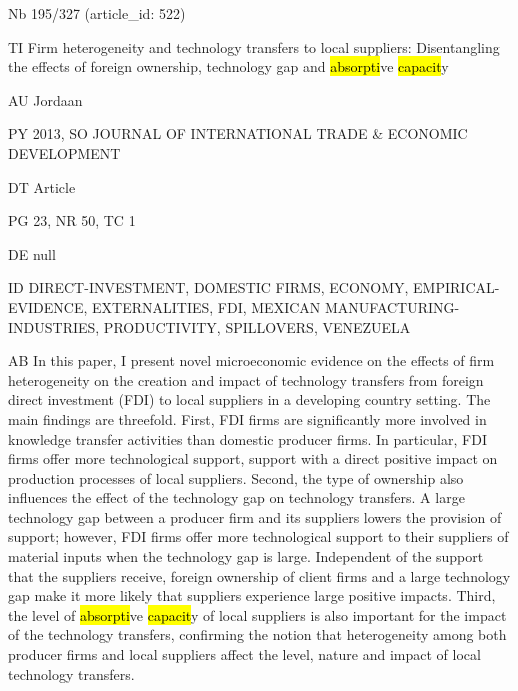 \documentclass[a4paper]{article}
\begin{document}
\vspace*{-2cm}
Nb \tabto{0cm}195/327 (article\_id: 522)\par
TI \tabto{0cm}Firm heterogeneity and technology transfers to local suppliers: Disentangling the effects of foreign ownership, technology gap and \hl{absorpti}ve \hl{capacit}y\par
AU \tabto{0cm}Jordaan\par
PY \tabto{0cm}2013, SO JOURNAL OF INTERNATIONAL TRADE \& ECONOMIC DEVELOPMENT\par
DT \tabto{0cm}Article\par
PG \tabto{0cm}23, NR 50, TC 1\par
DE \tabto{0cm}null\par
ID \tabto{0cm}DIRECT-INVESTMENT, DOMESTIC FIRMS, ECONOMY, EMPIRICAL-EVIDENCE, EXTERNALITIES, FDI, MEXICAN MANUFACTURING-INDUSTRIES, PRODUCTIVITY, SPILLOVERS, VENEZUELA\par
AB \tabto{0cm}In this paper, I present novel microeconomic evidence on the effects of firm heterogeneity on the creation and impact of technology transfers from foreign direct investment (FDI) to local suppliers in a developing country setting. The main findings are threefold. First, FDI firms are significantly more involved in knowledge transfer activities than domestic producer firms. In particular, FDI firms offer more technological support, support with a direct positive impact on production processes of local suppliers. Second, the type of ownership also influences the effect of the technology gap on technology transfers. A large technology gap between a producer firm and its suppliers lowers the provision of support; however, FDI firms offer more technological support to their suppliers of material inputs when the technology gap is large. Independent of the support that the suppliers receive, foreign ownership of client firms and a large technology gap make it more likely that suppliers experience large positive impacts. Third, the level of \hl{absorpti}ve \hl{capacit}y of local suppliers is also important for the impact of the technology transfers, confirming the notion that heterogeneity among both producer firms and local suppliers affect the level, nature and impact of local technology transfers.\par
\clearpage
\end{document}
